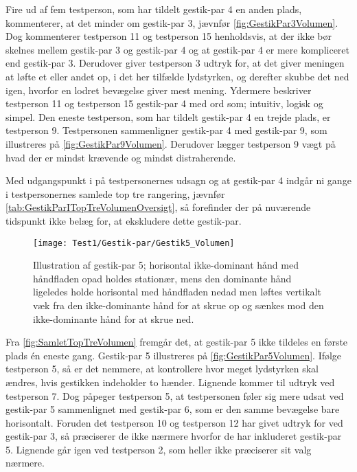 Fire ud af fem testperson, som har tildelt gestik-par 4 en anden plads, kommenterer, at det minder om gestik-par 3, jævnfør \autoref{fig:GestikPar3Volumen}. Dog kommenterer testperson 11 og testperson 15 henholdsvis, at der ikke bør skelnes mellem gestik-par 3 og gestik-par 4 og at gestik-par 4 er mere kompliceret end gestik-par 3. Derudover giver testperson 3 udtryk for, at det giver meningen at løfte et eller andet op, i det her tilfælde lydstyrken, og derefter skubbe det ned igen, hvorfor en lodret bevægelse giver mest mening. Ydermere beskriver testperson 11 og testperson 15 gestik-par 4 med ord som; intuitiv, logisk og simpel. Den eneste testperson, som har tildelt gestik-par 4 en trejde plads, er testperson 9. Testpersonen sammenligner gestik-par 4 med gestik-par 9, som illustreres på \autoref{fig:GestikPar9Volumen}. Derudover lægger testperson 9 vægt på hvad der er mindst krævende og mindst distraherende. 

Med udgangspunkt i på testpersonernes udsagn og at gestik-par 4 indgår ni gange i testpersonernes samlede top tre rangering, jævnfør \autoref{tab:GestikParITopTreVolumenOversigt}, så forefinder der på nuværende tidspunkt ikke belæg for, at ekskludere dette gestik-par.  
%
\begin{figure}[H]
	\centering
	\texttt{[image: Test1/Gestik-par/Gestik5\_Volumen]}
	\caption{Illustration af gestik-par 5; horisontal ikke-dominant hånd med håndfladen opad holdes stationær, mens den dominante hånd ligeledes holde horisontal med håndfladen nedad men løftes vertikalt væk fra den ikke-dominante hånd for at skrue op og sænkes mod den ikke-dominante hånd for at skrue ned.}
	\label{fig:GestikPar5Volumen}
\end{figure}
\noindent
%
Fra \autoref{fig:SamletTopTreVolumen} fremgår det, at gestik-par 5 ikke tildeles en første plads én eneste gang. Gestik-par 5 illustreres på \autoref{fig:GestikPar5Volumen}. Ifølge testperson 5, så er det nemmere, at kontrollere hvor meget lydstyrken skal ændres, hvis gestikken indeholder to hænder. Lignende kommer til udtryk ved testperson 7. Dog påpeger testperson 5, at testpersonen føler sig mere udsat ved gestik-par 5 sammenlignet med gestik-par 6, som er den samme bevægelse bare horisontalt. Foruden det testperson 10 og testperson 12 har givet udtryk for ved gestik-par 3, så præciserer de ikke nærmere hvorfor de har inkluderet gestik-par 5. Lignende går igen ved testperson 2, som heller ikke præciserer sit valg nærmere. 

